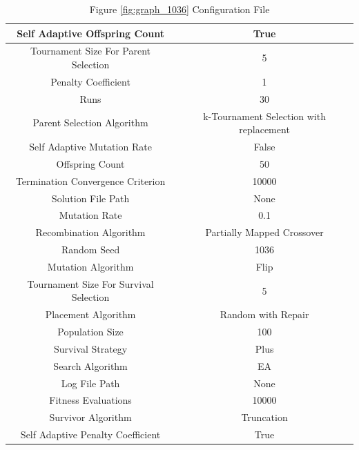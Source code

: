\documentclass{standalone}
\begin{document}
\begin{table}[!htb]
	\centering
	\caption{Figure \ref{fig:graph_1036} Configuration File}
	\label{tab:graph_1036}
	\begin{tabular}{| c | c |}
		\hline
		Self Adaptive Offspring Count		& True		 \\
		\hline
		Tournament Size For Parent Selection		& 5		 \\
		\hline
		Penalty Coefficient		& 1		 \\
		\hline
		Runs		& 30		 \\
		\hline
		Parent Selection Algorithm		& k-Tournament Selection with replacement		 \\
		\hline
		Self Adaptive Mutation Rate		& False		 \\
		\hline
		Offspring Count		& 50		 \\
		\hline
		Termination Convergence Criterion		& 10000		 \\
		\hline
		Solution File Path		& None		 \\
		\hline
		Mutation Rate		& 0.1		 \\
		\hline
		Recombination Algorithm		& Partially Mapped Crossover		 \\
		\hline
		Random Seed		& 1036		 \\
		\hline
		Mutation Algorithm		& Flip		 \\
		\hline
		Tournament Size For Survival Selection		& 5		 \\
		\hline
		Placement Algorithm		& Random with Repair		 \\
		\hline
		Population Size		& 100		 \\
		\hline
		Survival Strategy		& Plus		 \\
		\hline
		Search Algorithm		& EA		 \\
		\hline
		Log File Path		& None		 \\
		\hline
		Fitness Evaluations		& 10000		 \\
		\hline
		Survivor Algorithm		& Truncation		 \\
		\hline
		Self Adaptive Penalty Coefficient		& True		 \\
		\hline
	\end{tabular}
\end{table}
\end{document}
